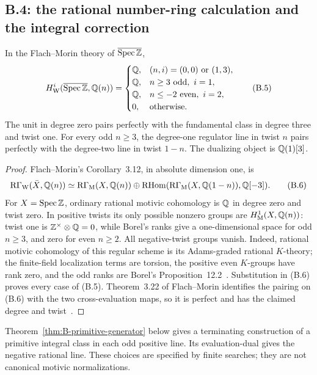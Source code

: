 \subsection{B.4: the rational number-ring calculation and the integral correction}
\begin{theorem}\label{thm:B-SpecZ-Q}
In the Flach--Morin theory of \(\overline{\operatorname{Spec}\mathbb Z}\),
\[
H^i_{\mathrm W}(\overline{\operatorname{Spec}\mathbb Z},\mathbb Q(n))=
\begin{cases}
\mathbb Q,&(n,i)=(0,0)\text{ or }(1,3),\\
\mathbb Q,&n\ge3\text{ odd},\ i=1,\\
\mathbb Q,&n\le-2\text{ even},\ i=2,\\
0,&\text{otherwise}.
\end{cases}\tag{B.5}
\]
The unit in degree zero pairs perfectly with the fundamental class in
degree three and twist one.  For every odd \(n\ge3\), the degree-one
regulator line in twist \(n\) pairs perfectly with the degree-two line
in twist \(1-n\).  The dualizing object is \(\mathbb Q(1)[3]\).
\end{theorem}
\begin{proof}
Flach--Morin's Corollary~3.12, in absolute dimension one, is
\[
\operatorname{R\Gamma}_{\mathrm W}(\bar X,\mathbb Q(n))\simeq
\operatorname{R\Gamma}_{\mathrm M}(X,\mathbb Q(n))\oplus
\operatorname{RHom}(\operatorname{R\Gamma}_{\mathrm M}(X,\mathbb Q(1-n)),\mathbb Q[-3]).\tag{B.6}
\]
For \(X=\operatorname{Spec}\mathbb Z\), ordinary rational motivic cohomology is \(\mathbb Q\)
in degree zero and twist zero.  In positive twists its only possible
nonzero groups are \(H^1_{\mathrm M}(X,\mathbb Q(n))\): twist one is
\(\mathbb Z^\times\otimes\mathbb Q=0\), while Borel's ranks give a one-dimensional
space for odd \(n\ge3\), and zero for even \(n\ge2\).
All negative-twist groups vanish.  Indeed, rational motivic cohomology
of this regular scheme is its Adams-graded rational \(K\)-theory;
the finite-field localization terms are torsion, the positive
even \(K\)-groups have rank zero, and the odd ranks are Borel's
Proposition~12.2~\cite{BBorel1974}.  Substitution in (B.6) proves
every case of (B.5).  Theorem~3.22 of Flach--Morin identifies the
pairing on (B.6) with the two cross-evaluation maps, so it is perfect
and has the claimed degree and twist~\cite[Corollary~3.12,
Theorem~3.22, and \S5.8.3]{BFlachMorin2018}.
\end{proof}

Theorem~\ref{thm:B-primitive-generator} below gives a terminating
construction of a primitive integral class in each odd positive line.
Its evaluation-dual gives the negative rational line.  These choices
are specified by finite searches; they are not canonical motivic
normalizations.

